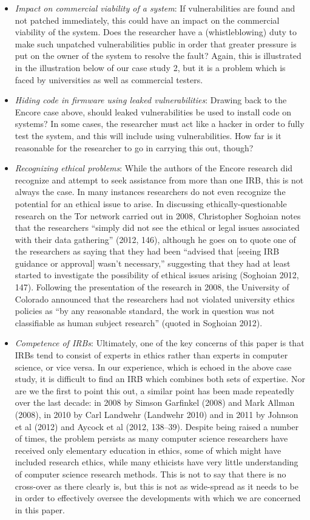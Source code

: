 \documentclass{svjour3}                     %
\begin{document}
\begin{itemize}
\item \emph{Impact on commercial viability of a system}:
If vulnerabilities are found and not patched immediately, this could have an impact on the commercial viability of the system.  Does the researcher have a (whistleblowing) duty to make such unpatched vulnerabilities public in order that greater pressure is put on the owner of the system to resolve the fault? Again, this is illustrated in the illustration below of our case study 2, but it is a problem which is faced by universities as well as commercial testers.
\item \emph{Hiding code in firmware using leaked vulnerabilities}:
Drawing back to the Encore case above, should leaked vulnerabilities be used to install code on systems? In some cases, the researcher must act like a hacker in order to fully test the system, and this will include using vulnerabilities. How far is it reasonable for the researcher to go in carrying this out, though?

\item\emph{Recognizing ethical problems}:
While the authors of the Encore research did recognize and attempt to seek assistance from more than one IRB, this is not always the case. In many instances researchers do not even recognize the potential for an ethical issue to arise. In discussing ethically-questionable research on the Tor network carried out in 2008, Christopher Soghoian notes that the researchers “simply did not see the ethical or legal issues associated with their data gathering” (2012, 146), although he goes on to quote one of the researchers as saying that they had been “advised that [seeing IRB guidance or approval] wasn’t necessary,” suggesting that they had at least started to investigate the possibility of ethical issues arising (Soghoian 2012, 147). Following the presentation of the research in 2008, the University of Colorado announced that the researchers had not violated university ethics policies as “by any reasonable standard, the work in question was not classifiable as human subject research” (quoted in Soghoian 2012).

\item \emph{Competence of IRBs}:
Ultimately, one of the key concerns of this paper is that IRBs tend to consist of experts in ethics rather than experts in computer science, or vice versa.  In our experience, which is echoed in the above case study, it is difficult to find an IRB which combines both sets of expertise. Nor are we the first to point this out, a similar point has been made repeatedly over the last decade: in 2008 by Simson Garfinkel (2008) and Mark Allman (2008), in 2010 by Carl Landwehr (Landwehr 2010) and in 2011 by Johnson et al (2012) and Aycock et al (2012, 138–39). Despite being raised a number of times, the problem persists as many computer science researchers have received only elementary education in ethics, some of which might have included research ethics, while many ethicists have very little understanding of computer science research methods. This is not to say that there is no cross-over as there clearly is, but this is not as wide-spread as it needs to be in order to effectively oversee the developments with which we are concerned in this paper.


\end{itemize}
\end{document}
